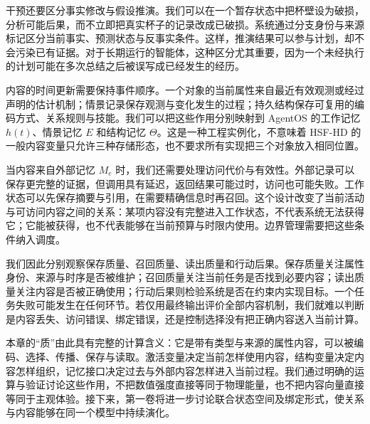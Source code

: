 干预还要区分事实修改与假设推演。我们可以在一个暂存状态中把杯壁设为破损，分析可能后果，而不立即把真实杯子的记录改成已破损。系统通过分支身份与来源标记区分当前事实、预测状态与反事实条件。这样，推演结果可以参与计划，却不会污染已有证据。对于长期运行的智能体，这种区分尤其重要，因为一个未经执行的计划可能在多次总结之后被误写成已经发生的经历。

内容的时间更新需要保持事件顺序。一个对象的当前属性来自最近有效观测或经过声明的估计机制；情景记录保存观测与变化发生的过程；持久结构保存可复用的编码方式、关系规则与技能。我们可以把这些作用分别映射到 AgentOS 的工作记忆 $h(t)$、情景记忆 $E$ 和结构记忆 $\Theta$。这是一种工程实例化，不意味着 HSF-HD 的一般内容变量只允许三种存储形态，也不要求所有实现把三个对象放入相同位置。

当内容来自外部记忆 $M_e$ 时，我们还需要处理访问代价与有效性。外部记录可以保存更完整的证据，但调用具有延迟，返回结果可能过时，访问也可能失败。工作状态可以先保存摘要与引用，在需要精确信息时再召回。这个设计改变了当前活动与可访问内容之间的关系：某项内容没有完整进入工作状态，不代表系统无法获得它；它能被获得，也不代表能够在当前预算与时限内使用。边界管理需要把这些条件纳入调度。

我们因此分别观察保存质量、召回质量、读出质量和行动后果。保存质量关注属性身份、来源与时序是否被维护；召回质量关注当前任务是否找到必要内容；读出质量关注内容是否被正确使用；行动后果则检验系统是否在约束内实现目标。一个任务失败可能发生在任何环节。若仅用最终输出评价全部内容机制，我们就难以判断是内容丢失、访问错误、绑定错误，还是控制选择没有把正确内容送入当前计算。

本章的“质”由此具有完整的计算含义：它是带有类型与来源的属性内容，可以被编码、选择、传播、保存与读取。激活变量决定当前怎样使用内容，结构变量决定内容怎样组织，记忆接口决定过去与外部内容怎样进入当前过程。我们通过明确的运算与验证讨论这些作用，不把数值强度直接等同于物理能量，也不把内容向量直接等同于主观体验。接下来，第一卷将进一步讨论联合状态空间及绑定形式，使关系与内容能够在同一个模型中持续演化。
